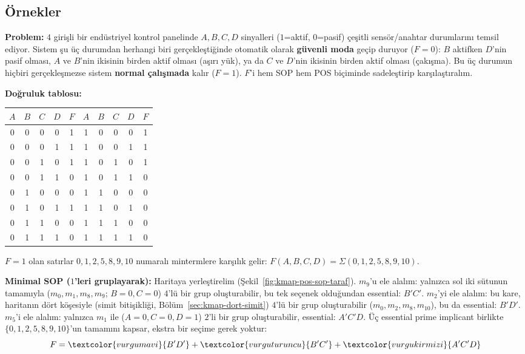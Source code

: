 \subsection{Örnekler}\label{sec:pos-ornek}
\begin{ornek}\label{orn:pos-sop}
\textbf{Problem:} $4$ girişli bir endüstriyel kontrol panelinde $A,B,C,D$ sinyalleri
($1$=aktif, $0$=pasif) çeşitli sensör/anahtar durumlarını temsil ediyor. Sistem şu üç
durumdan herhangi biri gerçekleştiğinde otomatik olarak \textbf{güvenli moda} geçip
duruyor ($F=0$): $B$ aktifken $D$'nin pasif olması, $A$ ve $B$'nin ikisinin birden
aktif olması (aşırı yük), ya da $C$ ve $D$'nin ikisinin birden aktif olması (çakışma).
Bu üç durumun hiçbiri gerçekleşmezse sistem \textbf{normal çalışmada} kalır ($F=1$).
$F$'i hem SOP hem POS biçiminde sadeleştirip karşılaştıralım.

\textbf{Doğruluk tablosu:}
\begin{center}
\begin{tabular}{cccc|c||cccc|c}
\toprule
$A$&$B$&$C$&$D$&$F$ & $A$&$B$&$C$&$D$&$F$\\
\midrule
0&0&0&0&1 & 1&0&0&0&1\\
0&0&0&1&1 & 1&0&0&1&1\\
0&0&1&0&1 & 1&0&1&0&1\\
0&0&1&1&0 & 1&0&1&1&0\\
0&1&0&0&0 & 1&1&0&0&0\\
0&1&0&1&1 & 1&1&0&1&0\\
0&1&1&0&0 & 1&1&1&0&0\\
0&1&1&1&0 & 1&1&1&1&0\\
\bottomrule
\end{tabular}
\end{center}
$F=1$ olan satırlar $0,1,2,5,8,9,10$ numaralı mintermlere karşılık gelir:
$F(A,B,C,D)=\Sigma(0,1,2,5,8,9,10)$.

\textbf{Minimal SOP ($1$'leri gruplayarak):} Haritaya yerleştirelim
(Şekil~\ref{fig:kmap-pos-sop-taraf}). $m_9$'u ele alalım: yalnızca sol iki sütunun
tamamıyla ($m_0,m_1,m_8,m_9$; $B=0,C=0$) $4$'lü bir grup oluşturabilir, bu tek seçenek
olduğundan essential: $B'C'$. $m_2$'yi ele alalım: bu kare, haritanın dört köşesiyle
(simit bitişikliği, Bölüm~\ref{sec:kmap-dort-simit}) $4$'lü bir grup oluşturabilir
($m_0,m_2,m_8,m_{10}$), bu da essential: $B'D'$. $m_5$'i ele alalım: yalnızca $m_1$ ile
($A=0,C=0,D=1$) $2$'li bir grup oluşturabilir, essential: $A'C'D$. Üç essential prime
implicant birlikte $\{0,1,2,5,8,9,10\}$'un tamamını kapsar, ekstra bir seçime gerek
yoktur:
\[
F = \textcolor{vurgumavi}{B'D'} + \textcolor{vurguturuncu}{B'C'} + \textcolor{vurgukirmizi}{A'C'D}
\]


\end{ornek}
